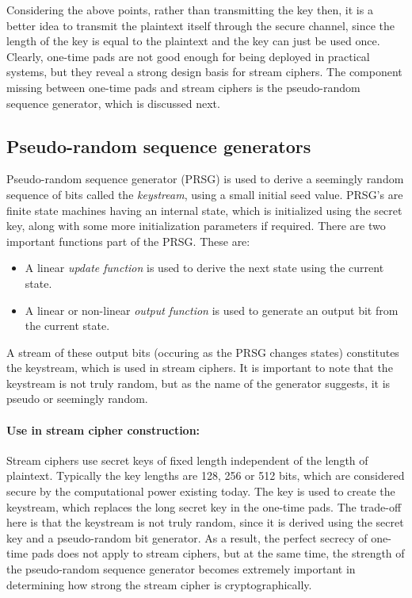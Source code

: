 Considering the above points, rather than transmitting the key then, it is a better idea to transmit the plaintext itself through the secure channel, since the length of the key is equal to the plaintext and the key can just be used once. Clearly, one-time pads are not good enough for being deployed in practical systems, but they reveal a strong design basis for stream ciphers. The component missing between one-time pads and stream ciphers is the pseudo-random sequence generator, which is discussed next. 


\subsection{Pseudo-random sequence generators}
\label{sec:psrg}

Pseudo-random sequence generator (PRSG) is used to derive a seemingly random sequence of bits called the \emph{keystream}, using a small initial seed value. PRSG's are finite state machines having an internal state, which is initialized using the secret key, along with some more initialization parameters if required. There are two important functions part of the PRSG. These are:
\begin{itemize}
\item A linear \emph{update function} is used to derive the next state using the current state.
\item A linear or non-linear \emph{output function} is used to generate an output bit from the current state. 
\end{itemize}

A stream of these output bits (occuring as the PRSG changes states) constitutes the keystream, which is used in stream ciphers. It is important to note that the keystream is not truly random, but as the name of the generator suggests, it is pseudo or seemingly random. 


\paragraph{Use in stream cipher construction:}
\label{para:stream-construction} 
Stream ciphers use secret keys of fixed length independent of the length of plaintext. Typically the key lengths are 128, 256 or 512 bits, which are considered secure by the computational power existing today. %
The key is used to create the keystream, which replaces the long secret key in the one-time pads. The trade-off here is that the keystream is not truly random, since it is derived using the secret key and a pseudo-random bit generator. As a result, the perfect secrecy of one-time pads does not apply to stream ciphers, but at the same time, the strength of the pseudo-random sequence generator becomes extremely important in determining how strong the stream cipher is cryptographically.


